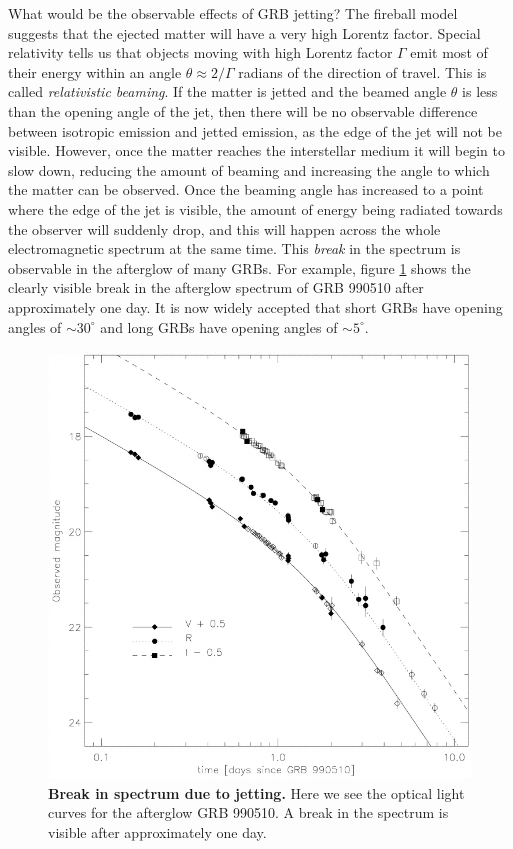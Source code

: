 \documentclass[11pt]{cuthesis}
\begin{document}
What would be the observable effects of GRB jetting? The fireball model suggests that the ejected matter will have a very high Lorentz factor. Special relativity tells us that objects moving with high Lorentz factor $\Gamma$ emit most of their energy within an angle $\theta\approx 2/\Gamma$ radians of the direction of travel. This is called \textit{relativistic beaming}. If the matter is jetted and the beamed angle $\theta$ is less than the opening angle of the jet, then there will be no observable difference between isotropic emission and jetted emission, as the edge of the jet will not be visible. However, once the matter reaches the interstellar medium it will begin to slow down, reducing the amount of beaming and increasing the angle to which the matter can be observed. Once the beaming angle has increased to a point where the edge of the jet is visible, the amount of energy being radiated towards the observer will suddenly drop, and this will happen across the whole electromagnetic spectrum at the same time. This \textit{break} in the spectrum is observable in the afterglow of many GRBs. For example, figure \ref{fig:jetbreak} shows the clearly visible break in the afterglow spectrum of GRB 990510 after approximately one day. It is now widely accepted that short GRBs have opening angles of $\sim30^\circ$\cite{GW170817_GRB} and long GRBs have opening angles of $\sim5^\circ$\cite{long_jet_angle}.

\begin{figure} %
\begin{center}
\includegraphics[width=0.8\linewidth]{jetbreak.png}
\end{center}
\caption{\textbf{Break in spectrum due to jetting.} Here we see the optical light curves for the afterglow GRB 990510. A break in the spectrum is visible after approximately one day.\cite{Harrison_1999} }
\label{fig:jetbreak}
\end{figure}
\end{document}
